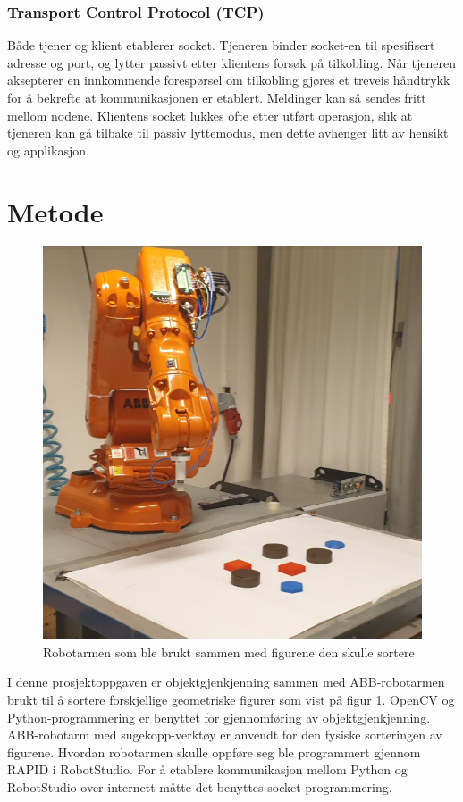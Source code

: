 \documentclass[conference]{IEEEtran}
\begin{document}
        \subsubsection{Transport Control Protocol (TCP)}
            Både tjener og klient etablerer socket. Tjeneren binder socket-en til spesifisert adresse og port, og lytter passivt etter klientens forsøk på tilkobling. Når tjeneren aksepterer en innkommende forespørsel om tilkobling gjøres et treveis håndtrykk for å bekrefte at kommunikasjonen er etablert. 
            Meldinger kan så sendes fritt mellom nodene. Klientens socket lukkes ofte etter utført operasjon, slik at tjeneren kan gå tilbake til passiv lyttemodus, men dette avhenger litt av hensikt og applikasjon.
    
\section{Metode}
    \begin{figure}
        \centering
        \includegraphics[width=.8\linewidth]{images/robotarm.png}
        \caption{Robotarmen som ble brukt sammen med figurene den skulle sortere}
        \label{fig:metode}
    \end{figure}

    I denne prosjektoppgaven er objektgjenkjenning sammen med ABB-robotarmen brukt til å sortere forskjellige geometriske figurer som vist på figur \ref{fig:metode}. OpenCV og Python-programmering er benyttet for gjennomføring av objektgjenkjenning. ABB-robotarm med sugekopp-verktøy er anvendt for den fysiske sorteringen av figurene. Hvordan robotarmen skulle oppføre seg ble programmert gjennom RAPID i RobotStudio. For å etablere kommunikasjon mellom Python og RobotStudio over internett måtte det benyttes socket programmering.
\end{document}
